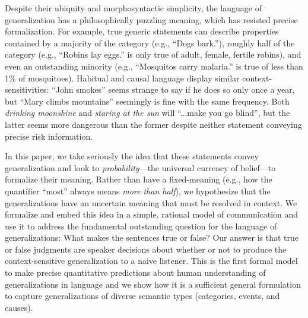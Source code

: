 \documentclass[11pt,letterpaper]{letter} %
\begin{document}
\begin{letter}
Despite their ubiquity and morphosyntactic simplicity, the language of generalization has a philosophically puzzling meaning, which has resisted precise formalization. 
For example, true generic statements can describe properties contained by a majority of the category (e.g., ``Dogs bark.''), roughly half of the category (e.g., ``Robins lay eggs.'' is only true of adult, female, fertile robins), and even an outstanding minority (e.g., ``Mosquitos carry malaria.'' is true of less than 1\% of mosquitoes). 
Habitual and causal language display similar context-sensitivities:
``John smokes'' seems strange to say if he does so only once a year, but ``Mary climbs mountains'' seemingly is fine with the same frequency.
Both \emph{drinking moonshine}  and \emph{staring at the sun} will ``...make you go blind'', but the latter seems more dangerous than the former despite neither statement conveying precise risk information.


In this paper, we take seriously the idea that these statements convey generalization and look to \emph{probability}---the universal currency of belief---to formalize their meaning. 
Rather than have a fixed-meaning (e.g., how the quantifier ``most'' always means \emph{more than half}), we hypothesize that the generalizations have an uncertain meaning that must be resolved in context.
We formalize and embed this idea in a simple, rational model of communication and use it to address the fundamental outstanding question for the language of generalizations: What makes the sentences true or false?
Our answer is that true or false judgments are speaker decisions about whether or not to produce the context-sensitive generalization to a naive listener.
This is the first formal model to make precise quantitative predictions about human understanding of generalizations in language and we show how it is a sufficient general formulation to capture generalizations of diverse semantic types (categories, events, and causes).


\end{letter}
\end{document}
